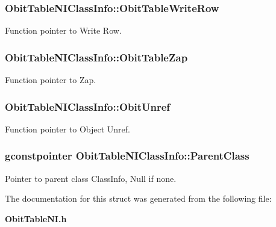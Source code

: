 \subsubsection{ {\bf Obit\-Table\-NIClass\-Info::Obit\-Table\-Write\-Row}}\label{structObitTableNIClassInfo_o26}


Function pointer to Write Row. 

\subsubsection{ {\bf Obit\-Table\-NIClass\-Info::Obit\-Table\-Zap}}\label{structObitTableNIClassInfo_o19}


Function pointer to Zap. 

\subsubsection{ {\bf Obit\-Table\-NIClass\-Info::Obit\-Unref}}\label{structObitTableNIClassInfo_o11}


Function pointer to Object Unref. 

\subsubsection{\setlength{\rightskip}{0pt plus 5cm}gconstpointer {\bf Obit\-Table\-NIClass\-Info::Parent\-Class}}\label{structObitTableNIClassInfo_o3}


Pointer to parent class Class\-Info, Null if none. 



The documentation for this struct was generated from the following file:\begin{CompactItemize}
\item 
{\bf Obit\-Table\-NI.h}\end{CompactItemize}
